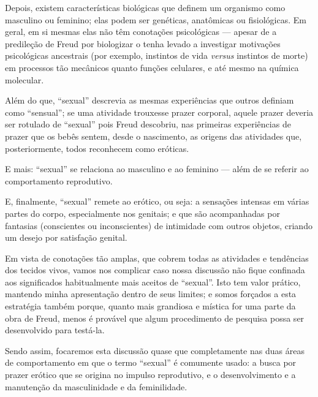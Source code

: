  Depois, existem características biológicas que definem um organismo
como masculino ou feminino; elas podem ser genéticas, anatômicas ou
fisiológicas. Em geral, em si mesmas elas não têm conotações
psicológicas --- apesar de a predileção de Freud por biologizar o tenha
levado a investigar motivações psicológicas ancestrais (por exemplo,
instintos\idxfreudinsti{} de vida \textit{versus} instintos de morte) em processos tão
mecânicos quanto funções celulares, e até mesmo na química molecular.

 Além do que, ``sexual'' descrevia as mesmas experiências que outros definiam como
``sensual''; se uma atividade trouxesse prazer\idxpraz{} corporal, aquele prazer deveria ser rotulado de
``sexual'' pois Freud descobriu, nas primeiras experiências de prazer que os bebês sentem, desde o
nascimento, as origens das atividades que, posteriormente, todos
reconhecem como eróticas.

 E mais: ``sexual'' se relaciona ao masculino
e ao feminino --- além de se referir ao comportamento reprodutivo.

 E, finalmente, ``sexual'' remete ao erótico,
ou seja: a sensações intensas em várias partes do corpo, especialmente
nos genitais; e que são acompanhadas por fantasias (conscientes ou
inconscientes) de intimidade com outros objetos, criando um desejo por
satisfação genital.

 Em vista de conotações tão amplas, que cobrem todas as atividades e
tendências dos tecidos vivos, vamos nos complicar caso nossa discussão
não fique confinada aos significados habitualmente mais aceitos de
``sexual''. Isto tem valor prático, mantendo
minha apresentação dentro de seus limites; e somos forçados a esta
estratégia também porque, quanto mais grandiosa e mística for uma parte
da obra de Freud, menos é provável que algum procedimento de pesquisa
possa ser desenvolvido para testá-la.

 Sendo assim, focaremos esta discussão quase que completamente nas duas
áreas de comportamento em que o termo
``sexual'' é comumente usado: a busca por
prazer erótico que se origina no impulso reprodutivo, e o
desenvolvimento e a manutenção da masculinidade e da feminilidade.

